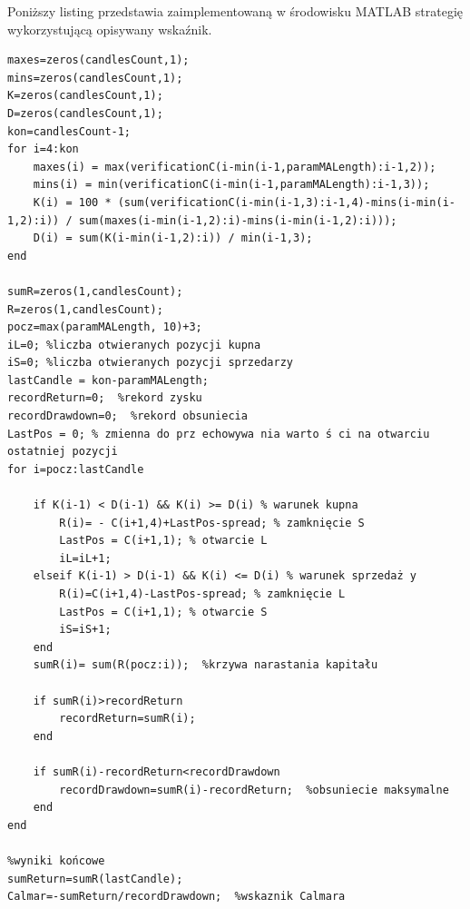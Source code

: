 \documentclass[12pt,a4paper]{article}
\begin{document}
\noindent Poniższy listing przedstawia zaimplementowaną w środowisku MATLAB strategię wykorzystującą opisywany wskaźnik.
\begin{scriptsize}
\begin{lstlisting}
maxes=zeros(candlesCount,1);
mins=zeros(candlesCount,1);
K=zeros(candlesCount,1);
D=zeros(candlesCount,1);
kon=candlesCount-1;
for i=4:kon
    maxes(i) = max(verificationC(i-min(i-1,paramMALength):i-1,2));
    mins(i) = min(verificationC(i-min(i-1,paramMALength):i-1,3));
    K(i) = 100 * (sum(verificationC(i-min(i-1,3):i-1,4)-mins(i-min(i-1,2):i)) / sum(maxes(i-min(i-1,2):i)-mins(i-min(i-1,2):i)));
    D(i) = sum(K(i-min(i-1,2):i)) / min(i-1,3);
end

sumR=zeros(1,candlesCount);
R=zeros(1,candlesCount);
pocz=max(paramMALength, 10)+3;
iL=0; %liczba otwieranych pozycji kupna
iS=0; %liczba otwieranych pozycji sprzedarzy
lastCandle = kon-paramMALength;
recordReturn=0;  %rekord zysku
recordDrawdown=0;  %rekord obsuniecia
LastPos = 0; % zmienna do prz echowywa nia warto ś ci na otwarciu ostatniej pozycji
for i=pocz:lastCandle
    
    if K(i-1) < D(i-1) && K(i) >= D(i) % warunek kupna
        R(i)= - C(i+1,4)+LastPos-spread; % zamknięcie S
        LastPos = C(i+1,1); % otwarcie L
        iL=iL+1;
    elseif K(i-1) > D(i-1) && K(i) <= D(i) % warunek sprzedaż y
        R(i)=C(i+1,4)-LastPos-spread; % zamknięcie L
        LastPos = C(i+1,1); % otwarcie S
        iS=iS+1;
    end
    sumR(i)= sum(R(pocz:i));  %krzywa narastania kapitału
    
    if sumR(i)>recordReturn
        recordReturn=sumR(i);
    end
    
    if sumR(i)-recordReturn<recordDrawdown
        recordDrawdown=sumR(i)-recordReturn;  %obsuniecie maksymalne
    end
end

%wyniki końcowe
sumReturn=sumR(lastCandle);
Calmar=-sumReturn/recordDrawdown;  %wskaznik Calmara
\end{lstlisting}
\end{scriptsize}
\end{document}

